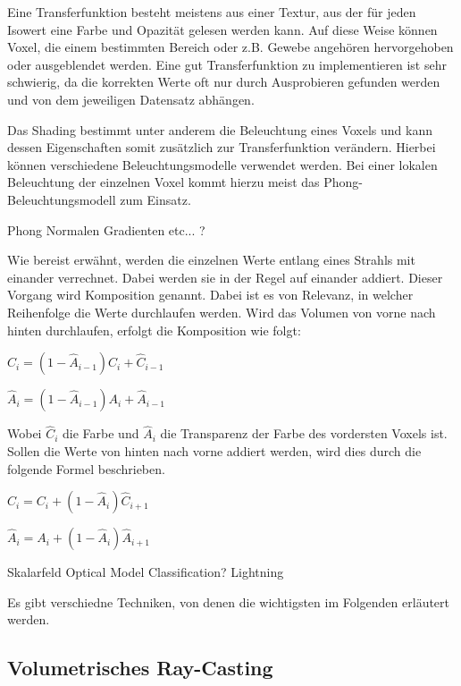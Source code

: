 Eine Transferfunktion besteht meistens aus einer Textur, aus der für jeden Isowert eine Farbe und Opazität gelesen werden kann. Auf diese Weise können Voxel, die einem bestimmten Bereich oder z.B. Gewebe angehören hervorgehoben oder ausgeblendet werden. Eine gut Transferfunktion zu implementieren ist sehr schwierig, da die korrekten Werte oft nur durch Ausprobieren gefunden werden und von dem jeweiligen Datensatz abhängen. 

Das Shading bestimmt unter anderem die Beleuchtung eines Voxels und kann dessen Eigenschaften somit zusätzlich zur Transferfunktion verändern. Hierbei können verschiedene Beleuchtungsmodelle verwendet werden.
Bei einer lokalen Beleuchtung der einzelnen Voxel kommt hierzu meist das Phong-Beleuchtungsmodell zum Einsatz. 

Phong
Normalen
Gradienten
etc...
?

Wie bereist erwähnt, werden die einzelnen Werte entlang eines Strahls mit einander verrechnet. Dabei werden sie in der Regel auf einander addiert. Dieser Vorgang wird Komposition genannt. Dabei ist es von Relevanz, in welcher Reihenfolge die Werte durchlaufen werden. Wird das Volumen von vorne nach hinten durchlaufen, erfolgt die Komposition wie folgt:

$\hat{C}_{i}=(1-\hat{A}_{i-1})C_{i}+\hat{C}_{i-1}$

$\hat{A}_{i}=(1-\hat{A}_{i-1})A_{i}+\hat{A}_{i-1}$

Wobei $\hat{C}_{i}$ die Farbe und $\hat{A}_{i}$ die Transparenz der Farbe des vordersten Voxels ist.
Sollen die Werte von hinten nach vorne addiert werden, wird dies durch die folgende Formel beschrieben.

$\hat{C}_{i}=C_{i}+(1-\hat{A}_{i})\hat{C}_{i+1}$

$\hat{A}_{i}=A_{i}+(1-\hat{A}_{i})\hat{A}_{i+1}$
 
Skalarfeld 
Optical Model
Classification?
Lightning

Es gibt verschiedne Techniken, von denen die wichtigsten im Folgenden erläutert werden.

\subsection{Volumetrisches Ray-Casting}
\label{rayCasting}

